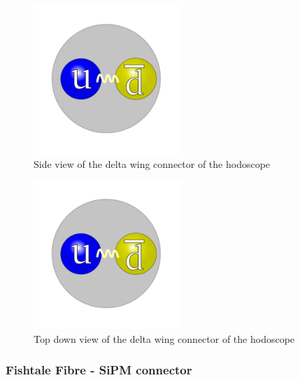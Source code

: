 \begin{figure}[!ht]
	\centering
	\includegraphics[width=0.5\textwidth]{ImgChap1/Meson2}
	\caption{Side view of the delta wing connector of the hodoscope}
	\label{DeltaWingSide}
\end{figure}

\begin{figure}[!ht]
	\centering
	\includegraphics[width=0.5\textwidth]{ImgChap1/Meson2}
	\caption{Top down view of the delta wing connector of the hodoscope}
	\label{DeltaWingTop}
\end{figure}



\subsubsection*{Fishtale Fibre - SiPM connector}

